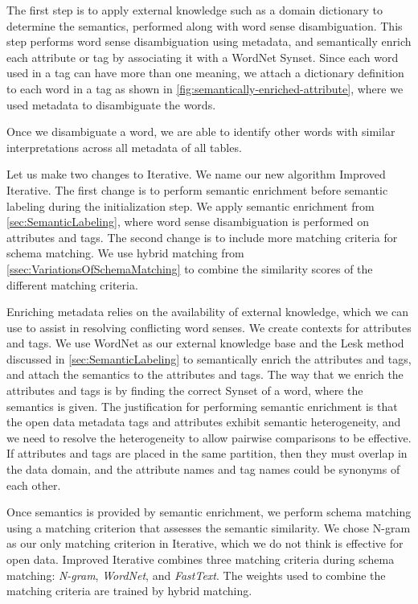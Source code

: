 

The first step is to apply external knowledge such as a domain dictionary to determine the semantics, performed along with word sense disambiguation.
This step performs word sense disambiguation using metadata, and semantically enrich each attribute or tag by associating it with a WordNet Synset.
Since each word used in a tag can have more than one meaning, we attach a dictionary definition to each word in a tag as shown in \autoref{fig:semantically-enriched-attribute}, where we used metadata to disambiguate the words.

Once we disambiguate a word, we are able to identify other words with similar interpretations across all metadata of all tables.

Let us make two changes to Iterative. We name our new algorithm Improved Iterative. The first change is to perform semantic enrichment before semantic labeling during the initialization step. We apply semantic enrichment from \autoref{sec:SemanticLabeling}, where word sense disambiguation is performed on attributes and tags. The second change is to include more matching criteria for schema matching. We use hybrid matching from \autoref{ssec:VariationsOfSchemaMatching} to combine the similarity scores of the different matching criteria.

Enriching metadata relies on the availability of external knowledge, which we can use to assist in resolving conflicting word senses. We create contexts for attributes and tags. We use WordNet as our external knowledge base and the Lesk method discussed in \autoref{sec:SemanticLabeling} to semantically enrich the attributes and tags, and attach the semantics to the attributes and tags. The way that we enrich the attributes and tags is by finding the correct Synset of a word, where the semantics is given. The justification for performing semantic enrichment is that the open data metadata tags and attributes exhibit semantic heterogeneity, and we need to resolve the heterogeneity to allow pairwise comparisons to be effective. If attributes and tags are placed in the same partition, then they must overlap in the data domain, and the attribute names and tag names could be synonyms of each other.

Once semantics is provided by semantic enrichment, we perform schema matching using a matching criterion that assesses the semantic similarity. We chose N-gram as our only matching criterion in Iterative, which we do not think is effective for open data. Improved Iterative combines three matching criteria during schema matching: \textit{N-gram}, \textit{WordNet}, and \textit{FastText}. The weights used to combine the matching criteria are trained by hybrid matching.

